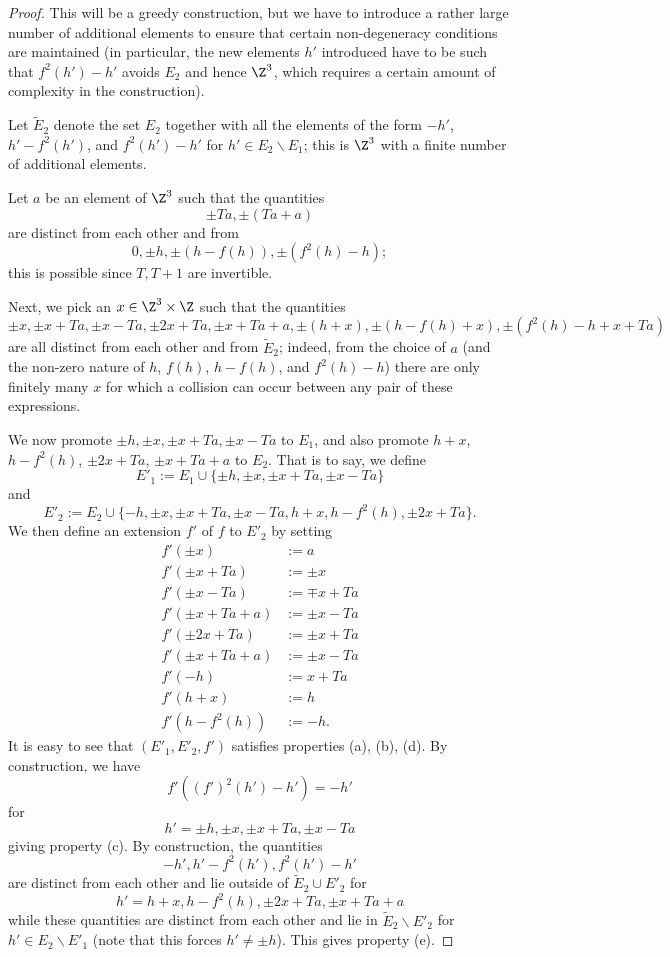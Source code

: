 \begin{proof} This will be a greedy construction, but we have to introduce a rather large number of additional elements to ensure that certain non-degeneracy conditions are maintained (in particular, the new elements $h'$ introduced have to be such that $f^2(h') - h'$ avoids $E_2$ and hence $\Z^3$, which requires a certain amount of complexity in the construction).

  Let $\tilde E_2$ denote the set $E_2$ together with all the elements of the form $-h'$, $h' - f^2(h')$, and $f^2(h') - h'$ for $h' \in E_2 \backslash E_1$; this is $\Z^3$ with a finite number of additional elements.

Let $a$ be an element of $\Z^3$ such that the quantities
$$ \pm Ta, \pm(Ta + a)$$
are distinct from each other and from
$$0, \pm h, \pm (h - f(h)), \pm (f^2(h)-h);$$
this is possible since $T, T+1$ are invertible.

Next, we pick an $x \in \Z^3 \times \Z$ such that the quantities
$$ \pm x, \pm x + Ta, \pm x - Ta, \pm 2 x + Ta, \pm x + Ta + a, \pm (h + x), \pm (h - f(h) + x), \pm (f^2(h)-h + x + Ta)$$
are all distinct from each other and from $\tilde E_2$; indeed, from the choice of $a$ (and the non-zero nature of $h$, $f(h)$, $h-f(h)$, and $f^2(h)-h$) there are only finitely many $x$ for which a collision can occur between any pair of these expressions.

We now promote $\pm h, \pm x, \pm x + Ta, \pm x - Ta$ to $E_1$, and also promote $h+x$, $h - f^2(h)$, $\pm 2x + Ta$, $\pm x + Ta + a$ to $E_2$.  That is to say, we define
$$ E'_1 := E_1 \cup \{\pm h, \pm x, \pm x + Ta, \pm x - Ta\}$$
and
$$ E'_2 := E_2 \cup \{ -h, \pm x, \pm x + Ta, \pm x - Ta, h + x, h - f^2(h), \pm 2x + Ta \}.$$
We then define an extension $f'$ of $f$ to $E'_2$ by setting
\begin{align*}
 f'(\pm x) &:= a \\
 f'(\pm x + Ta) &:= \pm x \\
 f'(\pm x - Ta) &:= \mp x + Ta \\
 f'(\pm x + Ta + a) &:= \pm x - Ta \\
 f'(\pm 2x + Ta) &:= \pm x + Ta \\
 f'(\pm x + Ta + a) &:= \pm x - Ta \\
 f'(-h) &:= x + Ta \\
 f'(h+x) &:= h \\
 f'(h - f^2(h)) &:= -h.
\end{align*}
It is easy to see that $(E'_1,E'_2,f')$ satisfies properties (a), (b), (d).  By construction, we have
$$ f'( (f')^2(h') - h') = -h'$$
for
$$ h' = \pm h, \pm x, \pm x+Ta, \pm x-Ta$$
giving property (c).  By construction, the quantities
$$ -h', h' - f^2(h'), f^2(h') - h'$$
are distinct from each other and lie outside of $\tilde E_2 \cup E'_2$ for
$$ h' = h+x, h - f^2(h), \pm 2x + Ta, \pm x + Ta + a$$
while these quantities are distinct from each other and lie in $\tilde E_2 \backslash E'_2$ for $h' \in E_2 \backslash E'_1$ (note that this forces $h' \neq \pm h$).  This gives property (e).
\end{proof}


